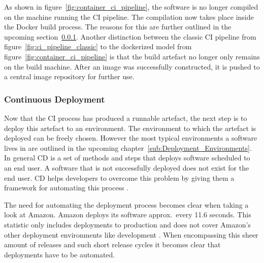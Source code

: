 As shown in figure~\ref{fig:container_ci_pipeline}, the software is no longer
compiled on the machine running the \ac{CI} pipeline. The compilation now takes
place inside the Docker build process. The reasons for this are further
outlined in the upcoming section~\ref{ssub:Continuous_Deployment}. Another
distinction between the classic \ac{CI} pipeline from
figure~\ref{fig:ci_pipeline_classic} to the dockerized model from
figure~\ref{fig:container_ci_pipeline} is that the build artefact no longer
only remains on the build machine. After an image was successfully constructed,
it is pushed to a central image repository for further use.

\subsubsection{Continuous Deployment}%
\label{ssub:Continuous_Deployment}
Now that the \ac{CI} process has produced a runnable artefact, the next step is
to deploy this artefact to an environment. The environment to which the
artefact is deployed can be freely chosen. However the most typical
environments a software lives in are outlined in the upcoming
chapter~\ref{sub:Deployment_Environments}. In general \ac{CD} is a set of
methods and steps that deploys software scheduled to an end user. A software
that is not successfully deployed does not exist for the end user. \ac{CD}
helps developers to overcome this problem by giving them a framework for
automating this process \autocite[pp. 190]{MatyasContinuousIntegration2007}.

The need for automating the deployment process becomes clear when taking a look
at Amazon. Amazon deploys its software approx.\ every 11.6 seconds. This
statistic only includes deployments to production and does not cover Amazon's
other deployment environments like development
\autocite{JenkinsVelocityCulture2011}. When encompassing this sheer amount of
releases and such short release cycles it becomes clear that deployments have
to be automated.

